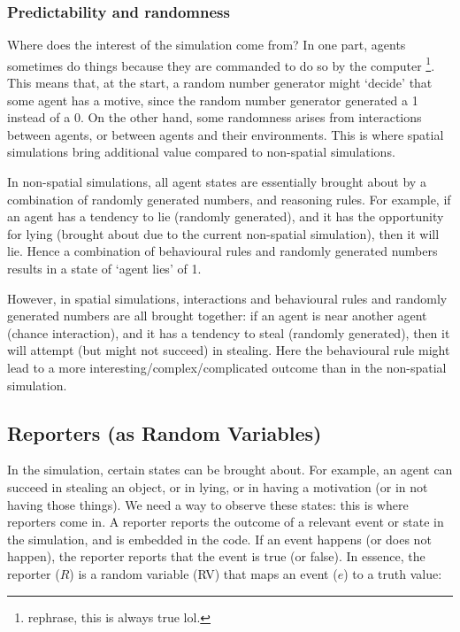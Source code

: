 \subsubsection{Predictability and randomness}
Where does the interest of the simulation come from? In one part, agents sometimes do things because they are commanded to do so by the computer \footnote{rephrase, this is always true lol.}. This means that, at the start, a random number generator might `decide' that some agent has a motive, since the random number generator generated a 1 instead of a 0. On the other hand, some randomness arises from interactions between agents, or between agents and their environments. This is where spatial simulations bring additional value compared to non-spatial simulations.

 In non-spatial simulations, all agent states are essentially brought about by a combination of randomly generated numbers, and reasoning rules. For example, if an agent has a tendency to lie (randomly generated), and it has the opportunity for lying (brought about due to the current non-spatial simulation), then it will lie. Hence a combination of behavioural rules and randomly generated numbers results in a state of `agent lies' of 1.
 
 However, in spatial simulations, interactions and behavioural rules and randomly generated numbers are all brought together: if an agent is near another agent (chance interaction), and it has a tendency to steal (randomly generated), then it will attempt (but might not succeed) in stealing. Here the behavioural rule might lead to a more interesting/complex/complicated outcome than in the non-spatial simulation.
 


\subsection{Reporters (as Random Variables)}

In the simulation, certain states can be brought about. For example, an agent can succeed in stealing an object, or in lying, or in having a motivation (or in not having those things). We need a way to observe these states: this is where reporters come in. A reporter reports the outcome of a relevant event or state in the simulation, and is embedded in the code. If an event happens (or does not happen), the reporter reports that the event is true (or false). In essence, the reporter ($R$) is a random variable (RV) that maps an event ($e$) to a truth value:

